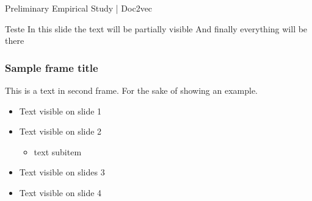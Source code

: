 \documentclass[aspectratio=169,t]{beamer}
\begin{document}
\mainpoint
\begin{frame}{Preliminary Empirical Study | Doc2vec}

\end{frame}

\verti
{}

\begin{frame}{Teste}
In this slide 
the text will be partially visible 
And finally everything will be there
\end{frame}

\begin{frame}
\frametitle{Sample frame title}
This is a text in second frame. For the sake of showing an example.

\begin{itemize}
    \item<1-> Text visible on slide 1
    \item<2-> Text visible on slide 2
    \begin{itemize}
        \item text subitem
    \end{itemize}
    \item<3> Text visible on slides 3
    \item<4-> Text visible on slide 4
\end{itemize}
\end{frame}
\end{document}
